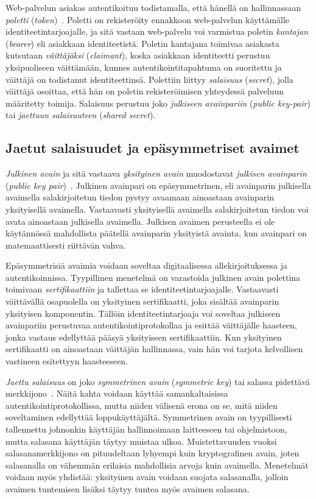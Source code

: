 \documentclass[finnish,gradu]{tktltiki}
\begin{document}
  Web-palvelun asiakas autentikoituu todistamalla, että hänellä on hallinnassaan \emph{poletti} (\emph{token})~\cite{NIST_SP800-63-1}. Poletti on rekisteröity ennakkoon web-palvelun käyttämälle identiteetintarjoajalle, ja sitä vastaan web-palvelu voi varmistua poletin \emph{kantajan} (\emph{bearer}) eli asiakkaan identiteetistä. Poletin kantajana toimivaa asiakasta kutsutaan \emph{väittäjäksi} (\emph{claimant}), koska asiakkaan identiteetti perustuu yksipuoliseen väittämään, kunnes autentikointitapahtuma on suoritettu ja väittäjä on todistanut identiteettinsä. Polettiin liittyy \emph{salaisuus} (\emph{secret}), jolla väittäjä osoittaa, että hän on poletin rekisteröimisen yhteydessä palveluun määritetty toimija. Salaisuus perustuu joko \emph{julkiseen avainpariin} (\emph{public key-pair}) tai \emph{jaettuun salaisuuteen} (\emph{shared secret}).


  \subsection{Jaetut salaisuudet ja epäsymmetriset avaimet} %
  \label{sub:pki}

  \emph{Julkinen avain} ja sitä vastaava \emph{yksityinen avain} muodostavat \emph{julkisen avainparin} (\emph{public key pair})~\cite{NIST_SP800-63-1}. Julkinen avainpari on epäsymmetrinen, eli avainparin julkisella avaimella salakirjoitetun tiedon pystyy avaamaan ainoastaan avainparin yksityisellä avaimella. Vastaavasti yksityisellä avaimella salakirjoitetun tiedon voi avata ainoastaan julkisella avaimella. Julkisen avaimen perusteella ei ole käytännössä mahdollista päätellä avainparin yksityistä avainta, kun avainpari on matemaattisesti riittävän vahva.

  Epäsymmetrisiä avaimia voidaan soveltaa digitaalisessa allekirjoituksessa ja autentikoinnissa. Tyypillinen menetelmä on varastoida julkinen avain polettina toimivaan \emph{sertifikaattiin} ja tallettaa se identiteetintarjoajalle. Vastaavasti väittävällä osapuolella on yksityinen sertifikaatti, joka sisältää avainparin yksityisen komponentin. Tällöin identiteetintarjoaja voi soveltaa julkiseen avainpariin perustuvaa autentikointiprotokollaa ja esittää väittäjälle haasteen, jonka vastaus edellyttää pääsyä yksityiseen sertifikaattiin. Kun yksityinen sertifikaatti on ainoastaan väittäjän hallinnassa, vain hän voi tarjota kelvollisen vastineen esitettyyn haasteeseen.

  \emph{Jaettu salaisuus} on joko \emph{symmetrinen avain} (\emph{symmetric key}) tai salassa pidettävä merkkijono~\cite{NIST_SP800-63-1}. Näitä kahta voidaan käyttää samankaltaisissa autentikointiprotokollissa, mutta niiden välisenä erona on se, mitä niiden soveltaminen edellyttää loppukäyttäjältä. Symmetrinen avain on tyypillisesti tallennettu johnonkin käyttäjän hallinnoimaan laitteeseen tai ohjelmistoon, mutta salasana käyttäjän täytyy muistaa ulkoa. Muistettavuuden vuoksi salasanamerkkijono on pituudeltaan lyhyempi kuin kryptografinen avain, joten salasanalla on vähemmän erilaisia mahdollisia arvoja kuin avaimella. Menetelmät voidaan myös yhdistää: yksityinen avain voidaan suojata salasanalla, jolloin avaimen tuntemisen lisäksi täytyy tuntea myös avaimen salasana.
\end{document}
